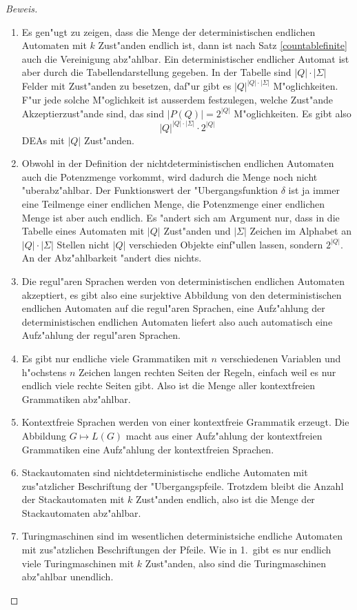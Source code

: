 \begin{proof}[Beweis]
\begin{enumerate}
\item Es gen"ugt zu zeigen, dass die Menge der deterministischen
endlichen Automaten mit $k$ Zust"anden endlich ist, dann ist nach
Satz \ref{countablefinite} auch die Vereinigung abz"ahlbar. Ein
deterministischer endlicher Automat ist aber durch die Tabellendarstellung
gegeben. In der Tabelle sind $|Q|\cdot|\Sigma|$ Felder mit Zust"anden
zu besetzen, daf"ur gibt es $|Q|^{|Q|\cdot|\Sigma|}$ M"oglichkeiten.
F"ur jede solche M"oglichkeit ist ausserdem festzulegen, welche Zust"ande
Akzeptierzust"ande sind, das sind $|P(Q)|=2^{|Q|}$ M"oglichkeiten. Es gibt
also
\[
|Q|^{|Q|\cdot|\Sigma|}\cdot 2^{|Q|}
\]
DEAs mit $|Q|$ Zust"anden.
\item Obwohl in der Definition der nichtdeterministischen endlichen
Automaten auch die Potenzmenge vorkommt, wird dadurch die Menge
noch nicht "uber\-abz"ahlbar. Der Funktionswert der "Ubergangsfunktion
$\delta$ ist ja immer eine Teilmenge einer endlichen Menge, die Potenzmenge
einer endlichen Menge ist aber auch endlich. Es "andert sich am Argument
nur, dass in die Tabelle eines Automaten mit $|Q|$ Zust"anden und
$|\Sigma|$ Zeichen im Alphabet an $|Q|\cdot|\Sigma|$ Stellen
nicht $|Q|$ verschieden Objekte einf"ullen lassen, sondern $2^{|Q|}$.
An der Abz"ahlbarkeit "andert dies nichts.
\item Die regul"aren Sprachen werden von deterministischen endlichen
Automaten akzeptiert, es gibt also eine surjektive Abbildung von
den deterministischen endlichen Automaten auf die regul"aren Sprachen,
eine Aufz"ahlung der deterministischen endlichen Automaten liefert also
auch automatisch eine Aufz"ahlung der regul"aren Sprachen.
\item Es gibt nur endliche viele Grammatiken mit $n$ verschiedenen
Variablen und h"ochstens $n$ Zeichen langen rechten Seiten der Regeln,
einfach weil es nur endlich viele rechte Seiten gibt. Also ist die
Menge aller kontextfreien Grammatiken abz"ahlbar.
\item Kontextfreie Sprachen werden von einer kontextfreie Grammatik
erzeugt. Die Abbildung $G\mapsto L(G)$ macht aus einer Aufz"ahlung
der kontextfreien Grammatiken eine Aufz"ahlung der kontextfreien Sprachen.
\item Stackautomaten sind nichtdeterministische endliche Automaten mit
zus"atzlicher Beschriftung der "Ubergangspfeile. Trotzdem bleibt die
Anzahl der Stackautomaten mit $k$ Zust"anden endlich, also ist die
Menge der Stackautomaten abz"ahlbar.
\item Turingmaschinen sind im wesentlichen deterministsiche endliche Automaten
mit zus"atzlichen Beschriftungen der Pfeile. Wie in 1.~gibt es nur endlich
viele Turingmaschinen mit $k$ Zust"anden, also sind die Turingmaschinen
abz"ahlbar unendlich.
\end{enumerate}
\end{proof}

